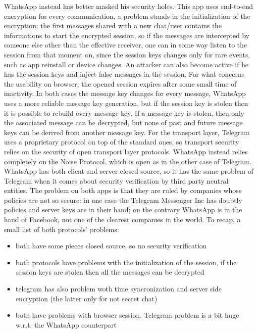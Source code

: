 \documentclass{article}
\begin{document}
WhatsApp instead has better masked his security holes. This app uses end-to-end encryption for every communication, a problem stands in the initialization of the encryption: the first messages shared with a new chat/user contains the informations to start the encrypted session, so if the messages are intercepted by someone else other than the effective receiver, one can in some way listen to the session from that moment on, since the session keys changes only for rare events, such as app reinstall or device changes. An attacker can also become active if he has the session keys and inject false messages in the session. For what concerns the usability on browser, the opened session expires after some small time of inactivity.\newline
In both cases the message key changes for every message, WhatsApp uses a more reliable message key generation, but if the session key is stolen then it is possible to rebuild every message key. If a message key is stolen, then only the associated message can be decrypted, but none of past and future message keys can be derived from another message key.\newline
For the transport layer, Telegram uses a proprietary protocol on top of the standard ones, so transport security relies on the security of open transport layer protocols. WhatsApp instead relies completely on the Noise Protocol, which is open as in the other case of Telegram.\newline
WhatsApp has both client and server closed source, so it has the same problem of Telegram when it comes about security verification by third party neutral entities.\newline
The problem on both apps is that they are ruled by companies whose policies are not so secure: in one case the Telegram Messenger Inc has doubtly policies \cite{tel_policy} and server keys are in their hand; on the contrary WhatsApp \cite{whats_policy} is in the hand of Facebook, not one of the clearest companies in the world.\newline
To recap, a small list of both protocols' problems:

\begin{itemize}
	\item both have some pieces closed source, so no security verification
	\item both protocols have problems with the initialization of the session, if the session keys are stolen then all the messages can be decrypted
	\item telegram has also problem woth time syncronization and server side encryption (the latter only for not secret chat) 
	\item both have problems with browser session, Telegram problem is a bit huge w.r.t. the WhatsApp counterpart
\end{itemize}
\end{document}
